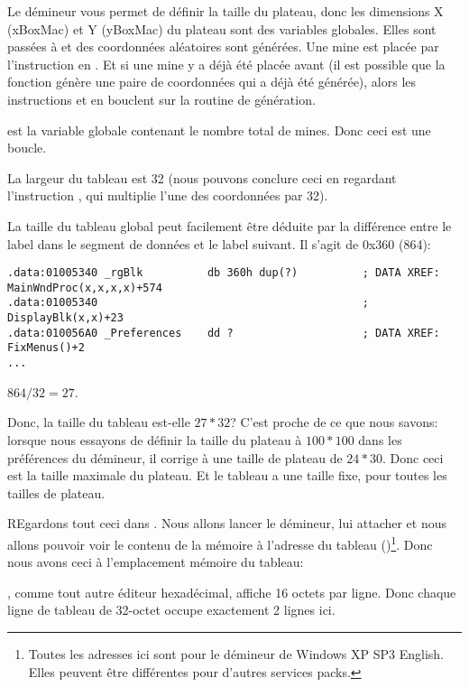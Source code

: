 Le démineur vous permet de définir la taille du plateau, donc les dimensions X (xBoxMac)
et Y (yBoxMac) du plateau sont des variables globales.
Elles sont passées à  et des coordonnées aléatoires sont générées.
Une mine est placée par l'instruction  en .
Et si une mine y a déjà été placée avant (il est possible que la fonction 
génère une paire de coordonnées qui a déjà été générée), alors les instructions 
et  en  bouclent sur la routine de génération.

 est la variable globale contenant le nombre total de mines. Donc
ceci est une boucle.

La largeur du tableau est 32 (nous pouvons conclure ceci en regardant l'instruction
, qui multiplie l'une des coordonnées par 32).

La taille du tableau global  peut facilement être déduite par la différence
entre le label  dans le segment de données et le label suivant. Il s'agit
de 0x360 (864):

\begin{lstlisting}[style=customasmx86]
.data:01005340 _rgBlk          db 360h dup(?)          ; DATA XREF: MainWndProc(x,x,x,x)+574
.data:01005340                                         ; DisplayBlk(x,x)+23
.data:010056A0 _Preferences    dd ?                    ; DATA XREF: FixMenus()+2
...
\end{lstlisting}

$864/32=27$.

Donc, la taille du tableau est-elle $27*32$?
C'est proche de ce que nous savons: lorsque nous essayons de définir la taille du
plateau à $100*100$ dans les préférences du démineur, il corrige à une taille de
plateau de $24*30$.
Donc ceci est la taille maximale du plateau.
Et le tableau a une taille fixe, pour toutes les tailles de plateau.

REgardons tout ceci dans \olly.
Nous allons lancer le démineur, lui attacher \olly et nous allons pouvoir voir le
contenu de la mémoire à l'adresse du tableau  ()\footnote{Toutes
les adresses ici sont pour le démineur de Windows XP SP3 English. Elles peuvent être
différentes pour d'autres services packs.}.
Donc nous avons ceci à l'emplacement mémoire du tableau:



\olly, comme tout autre éditeur hexadécimal, affiche 16 octets par ligne.
Donc chaque ligne de tableau de 32-octet occupe exactement 2 lignes ici.

